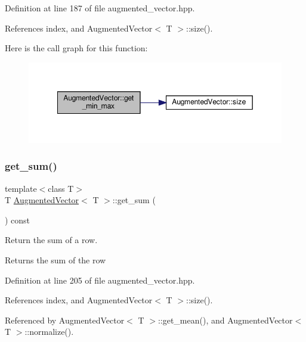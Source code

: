 Definition at line 187 of file augmented\+\_\+vector.\+hpp.



References index, and Augmented\+Vector$<$ T $>$\+::size().

Here is the call graph for this function\+:
\nopagebreak
\begin{figure}[H]
\begin{center}
\leavevmode
\includegraphics[width=349pt]{d1/d7a/classAugmentedVector_acf2a88cd2abcdf96eed0277e9cfbd241_cgraph}
\end{center}
\end{figure}
\mbox{\label{classAugmentedVector_a2eb88fec648538a49922dbcd0ef277ee}} 
\subsubsection{\texorpdfstring{get\+\_\+sum()}{get\_sum()}}
{\footnotesize\ttfamily template$<$class T$>$ \\
T \hyperlink{classAugmentedVector}{Augmented\+Vector}$<$ T $>$\+::get\+\_\+sum (\begin{DoxyParamCaption}{ }\end{DoxyParamCaption}) const\hspace{0.3cm}{\ttfamily [inline]}}



Return the sum of a row. 

\begin{DoxyReturn}{Returns}
the sum of the row 
\end{DoxyReturn}


Definition at line 205 of file augmented\+\_\+vector.\+hpp.



References index, and Augmented\+Vector$<$ T $>$\+::size().



Referenced by Augmented\+Vector$<$ T $>$\+::get\+\_\+mean(), and Augmented\+Vector$<$ T $>$\+::normalize().

